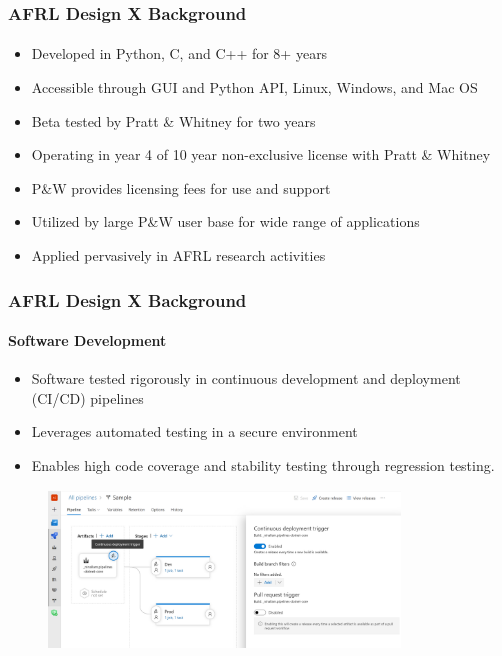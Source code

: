\documentclass[t]{beamer}
\begin{document}
\begin{frame}
  \frametitle{AFRL Design X Background}
  \framesubtitle{}

  \begin{itemize}
  \item Developed in Python, C, and C++ for 8+ years
  \item Accessible through GUI and Python API, Linux, Windows, and Mac OS
  \item Beta tested by Pratt \& Whitney for two years
  \item Operating in year 4 of 10 year non-exclusive license with Pratt \& Whitney
  \item P\&W provides licensing fees for use and support
  \item Utilized by large P\&W user base for wide range of applications
  \item Applied pervasively in AFRL research activities
  \end{itemize}

\end{frame}


\begin{frame}
  \frametitle{AFRL Design X Background}
  \framesubtitle{Software Development}

  \begin{itemize}
  \item Software tested rigorously in continuous development and deployment (CI/CD) pipelines
  \item Leverages automated testing in a secure environment
  \item Enables high code coverage and stability testing through regression testing.
  \end{itemize}

      \begin{figure}
       \includegraphics[height=1.65in]{./figures/ci-trigger.png}
      \end{figure}

\end{frame}
\end{document}
